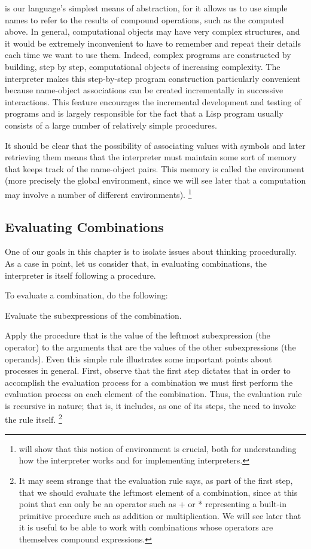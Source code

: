  is our language's simplest means of abstraction,
for it allows us to use simple names to refer to the results of compound operations,
such as the  computed above.
In general,
computational objects may have very complex structures,
and it would be extremely inconvenient to have to remember and repeat their details each time we want to use them.
Indeed, complex programs are constructed by building, step by step, computational objects of increasing complexity.
The interpreter makes this step-by-step program construction particularly convenient
because name-object associations can be created incrementally in successive interactions.
This feature encourages the incremental development and testing of programs
and is largely responsible for the fact that a Lisp program usually
consists of a large number of relatively simple procedures.

It should be clear that the possibility of associating values with symbols and later retrieving them
means that the interpreter must maintain some sort of memory that keeps track of the name-object pairs.
This memory is called the environment
(more precisely the global environment,
since we will see later that a computation may involve a number of different environments).
\footnote{%
    will show that this notion of environment is crucial,
   both for understanding how the interpreter works and for implementing interpreters.
}

\subsection{Evaluating Combinations}

One of our goals in this chapter is to isolate issues about thinking procedurally.
As a case in point, let us consider that,
in evaluating combinations, the interpreter is itself following a procedure.

\startitemize[1]
\item To evaluate a combination, do the following:
   \startitemize[n]
   \item Evaluate the subexpressions of the combination.
   \item Apply the procedure that is the value of the leftmost subexpression (the operator)
         to the arguments that are the values of the other subexpressions (the operands).
   \stopitemize
\stopitemize
Even this simple rule illustrates some important points about processes in general.
First, observe that the first step dictates
that in order to accomplish the evaluation process for a combination
we must first perform the evaluation process on each element of the combination.
Thus, the evaluation rule is recursive in nature;
that is, it includes, as one of its steps, the need to invoke the rule itself.
\footnote{%
   It may seem strange that the evaluation rule says,
   as part of the first step,
   that we should evaluate the leftmost element of a combination,
   since at this point that can only be an operator
   such as + or * representing a built-in primitive procedure such as addition or multiplication.
   We will see later that it is useful to be able to work with combinations
   whose operators are themselves compound expressions.
}

